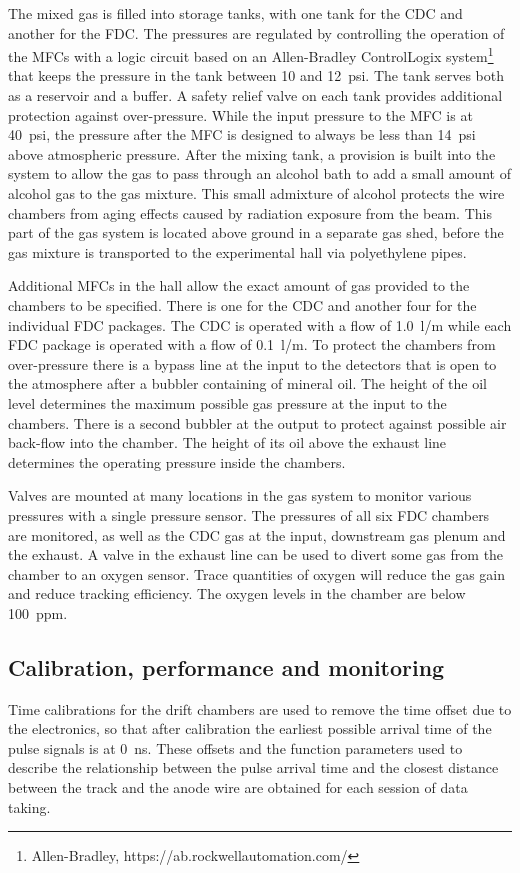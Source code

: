 The mixed gas is filled into storage tanks, with one tank for the CDC and another for the FDC. The pressures are
regulated by controlling the operation of the MFCs with a logic circuit based on an Allen-Bradley ControlLogix system\footnote{Allen-Bradley, https://ab.rockwellautomation.com/}
 that keeps
the pressure in the tank between 10 and 12~psi. The tank serves both as a reservoir and a buffer.
A safety relief valve on each tank
provides additional protection against over-pressure. While the input pressure to the MFC is at 40~psi, the pressure after
the MFC is designed to always be less than 14~psi above atmospheric pressure. After the mixing tank, a provision is
built into the system to allow the gas to pass through an alcohol bath to add a small amount of alcohol gas to the gas mixture.
This small admixture of alcohol protects the wire chambers from aging effects caused by radiation exposure from the beam.
This part of the gas system is located above ground in a separate gas shed, before the gas mixture is transported
to the experimental hall via polyethylene pipes.

Additional MFCs in the hall allow the exact amount of gas provided to the chambers to be specified. There is one for the CDC and another 
four for the individual FDC packages. The CDC is operated with a flow of 1.0~l/m while each FDC package is operated with
a flow of 0.1~l/m. To protect the chambers from over-pressure there is a bypass line at the input to the detectors that
is open to the atmosphere after a bubbler containing of mineral oil. The height of the oil level determines the maximum possible gas pressure at
the input to the chambers. There is a second bubbler at the output to protect against possible air back-flow into
the chamber. The height of its oil above the exhaust line determines the operating pressure inside the chambers.

Valves are mounted at many locations in the gas system to monitor various pressures with a single pressure sensor. The pressures of all six FDC chambers are monitored, as well as the CDC gas at the input, downstream gas plenum and the exhaust. 
A valve in the exhaust line can be used to divert some gas from the chamber to an oxygen sensor. Trace quantities of oxygen will reduce the gas gain and reduce tracking efficiency. The oxygen levels in the chamber are below 100~ppm.

\subsection{Calibration, performance and monitoring \label{sec:dccalib}}
Time calibrations for the drift chambers are used to remove the time offset due to the electronics, so that after calibration the earliest possible arrival time of the pulse signals is at 0~ns. These offsets and the function parameters used to describe the relationship between the pulse arrival time and the closest distance between the track and the anode wire are obtained for each session of data taking. 

